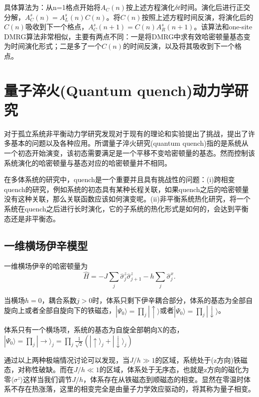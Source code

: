 \documentclass[12pt]{article}
\begin{document}
     具体算法为：从n=1格点开始将$A_C(n)$按上述方程演化$\delta t$时间。演化后进行正交分解，$A_C^s(n)=A_L^s(n)C(n)$。将$C(n)$按照上述方程时间反演，将演化后的$C(n)$吸收到下一个格点，$A_C^s(n+1)=C(n)A_R^s(n+1)$。该算法和one-site DMRG算法非常相似，主要有两点不同：一是将DMRG中求有效哈密顿量基态变为时间演化形式；二是多了一个$C(n)$的时间反演，以及将其吸收到下一个格点。
	  	
	\newpage
    {\centering\section{量子淬火(Quantum quench)动力学研究}     }

    对于孤立系统非平衡动力学研究发现对于现有的理论和实验提出了挑战，提出了许多基本的问题以及各种应用。所谓量子淬火研究(quantum quench)指的是系统从一个初态开始演变，该初态需要满足是一个平移不变哈密顿量的基态。然而控制该系统演化的哈密顿量与基态对应的哈密顿量并不相同。
    
    在多体系统的研究中，quench是一个重要并且具有挑战性的问题：(i)跨相变quench的研究，例如系统的初态具有某种长程关联，如果quench之后的哈密顿量没有这种关联，那么关联函数应该如何演变呢。(ii)非平衡系统热化研究，将一个系统在quench之后进行长时演化，它的子系统的热化形式是如何的，会达到平衡态还是非平衡态。
    
      \subsection{一维横场伊辛模型}
      一维横场伊辛的哈密顿量为
      \begin{equation}\hat{H}=-J\sum_j \hat{\sigma}_j^z \hat{\sigma}_{j+1}^z- h\sum_j\hat{\sigma}_j^x.\end{equation}
      
      
      当横场$h=0$，耦合系数$j>0$时，体系只剩下伊辛耦合部分，体系的基态为全部自旋向上或者全部自旋向下的铁磁态，$|\Psi_0\rangle=\prod_j|\uparrow\rangle$或者$|\Psi_0\rangle=\prod_j|\downarrow\rangle$。
      
      
      体系只有一个横场项，系统的基态为自旋全部朝向X的态，$|\Psi_0\rangle=\prod_j|\to\rangle_j=\prod_j\frac{1}{\sqrt{2}}(|\uparrow\rangle_j+|\downarrow\rangle_j)$
      
      通过以上两种极端情况讨论可以发现，当$J/h\gg1$的区域，系统处于(z方向)铁磁态，对称性破缺。而在$J/h\ll1$的区域，体系处于无序态，也就是z方向的磁化为零$\langle\sigma^z\rangle$这样当我们调节$J/h$，体系存在从铁磁态到顺磁态的相变。显然在零温时体系不存在热涨落，这里的相变完全是由量子力学效应驱动的，将其称为量子相变。
      
\end{document}
